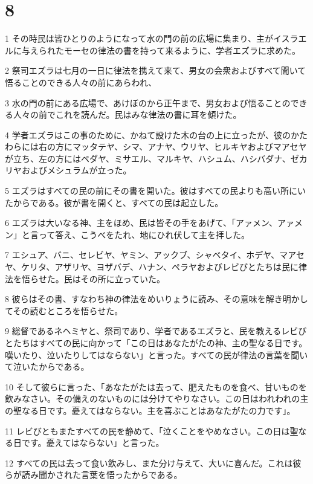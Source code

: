 \chapter{8}

\par 1 その時民は皆ひとりのようになって水の門の前の広場に集まり、主がイスラエルに与えられたモーセの律法の書を持って来るように、学者エズラに求めた。
\par 2 祭司エズラは七月の一日に律法を携えて来て、男女の会衆およびすべて聞いて悟ることのできる人々の前にあらわれ、
\par 3 水の門の前にある広場で、あけぼのから正午まで、男女および悟ることのできる人々の前でこれを読んだ。民はみな律法の書に耳を傾けた。
\par 4 学者エズラはこの事のために、かねて設けた木の台の上に立ったが、彼のかたわらには右の方にマッタテヤ、シマ、アナヤ、ウリヤ、ヒルキヤおよびマアセヤが立ち、左の方にはペダヤ、ミサエル、マルキヤ、ハシュム、ハシバダナ、ゼカリヤおよびメシュラムが立った。
\par 5 エズラはすべての民の前にその書を開いた。彼はすべての民よりも高い所にいたからである。彼が書を開くと、すべての民は起立した。
\par 6 エズラは大いなる神、主をほめ、民は皆その手をあげて、「アァメン、アァメン」と言って答え、こうべをたれ、地にひれ伏して主を拝した。
\par 7 エシュア、バニ、セレビヤ、ヤミン、アックブ、シャベタイ、ホデヤ、マアセヤ、ケリタ、アザリヤ、ヨザバデ、ハナン、ペラヤおよびレビびとたちは民に律法を悟らせた。民はその所に立っていた。
\par 8 彼らはその書、すなわち神の律法をめいりょうに読み、その意味を解き明かしてその読むところを悟らせた。
\par 9 総督であるネヘミヤと、祭司であり、学者であるエズラと、民を教えるレビびとたちはすべての民に向かって「この日はあなたがたの神、主の聖なる日です。嘆いたり、泣いたりしてはならない」と言った。すべての民が律法の言葉を聞いて泣いたからである。
\par 10 そして彼らに言った、「あなたがたは去って、肥えたものを食べ、甘いものを飲みなさい。その備えのないものには分けてやりなさい。この日はわれわれの主の聖なる日です。憂えてはならない。主を喜ぶことはあなたがたの力です」。
\par 11 レビびともまたすべての民を静めて、「泣くことをやめなさい。この日は聖なる日です。憂えてはならない」と言った。
\par 12 すべての民は去って食い飲みし、また分け与えて、大いに喜んだ。これは彼らが読み聞かされた言葉を悟ったからである。
